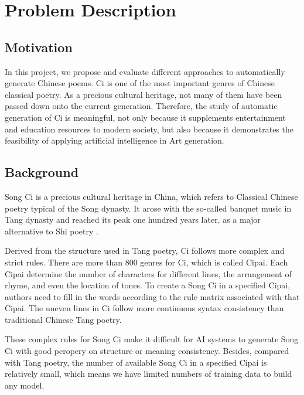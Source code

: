 \section{Problem Description}
\subsection{Motivation}  
%
In this project, we propose and evaluate different approaches to automatically generate Chinese poems. 
%
Ci is one of the most important genres of Chinese classical poetry. 
%
As a precious cultural heritage, not many of them have been passed down onto the current generation.
%
Therefore, the study of automatic generation of Ci is meaningful, not only because it supplements entertainment and education resources to modern society, but also because it demonstrates the feasibility of applying artificial intelligence in Art generation. 
%

\subsection{Background}
Song Ci is a precious cultural heritage in China, which refers to Classical Chinese poetry typical of the Song dynasty.
%
It arose with the so-called banquet music in Tang dynasty and reached its peak one hundred years later, as a major alternative to Shi poetry\cite{cai2008chinesepoetry} .


Derived from the structure used in Tang poetry, Ci follows more complex and strict rules.
%
There are more than 800 genres for Ci, which is called Cipai\cite{wikici}. 
%
Each Cipai determine the number of characters for different lines, the arrangement of rhyme, and even the location of tones.
%
To create a Song Ci in a specified Cipai, authors need to fill in the words according to the rule matrix associated with that Cipai.
 The uneven lines in Ci follow more continuous syntax consistency than traditional Chinese Tang poetry\cite{cai2008chinesepoetry}.
 
These complex rules for Song Ci make it difficult for AI systems to generate Song Ci with good peropery on structure or meaning consistency.
%
Besides, compared with Tang poetry, the number of available Song Ci in a specified Cipai is relatively small\cite{}, which means we have limited numbers of training data to build any model. 


